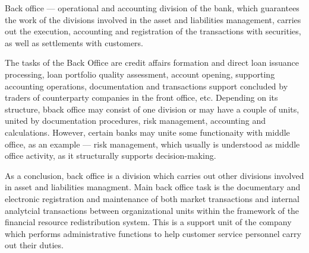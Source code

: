 Back office — operational and accounting division of the bank, which guarantees the work of the divisions involved in the  asset and liabilities management, carries out the execution, accounting and registration of the transactions with securities, as well as settlements with customers. 

The tasks of the Back Office are credit affairs formation and direct loan issuance processing, loan portfolio quality assessment, account opening, supporting accounting operations, documentation and transactions support concluded by traders of counterparty companies in the front office, etc. 
Depending on its structure, bback office may consist of one division or may have a couple of units, united by documentation procedures, risk management, accounting and calculations. However, certain banks may unite some functionaity with middle office, as an example — risk management, which usually is understood as middle office activity, as it structurally supports decision-making.

As a conclusion, back office is a division which carries out other divisions involved in asset and liabilities managment. 
Main back office task is the documentary and electronic registration and maintenance of both market transactions and internal analytcial transactions between organizational units within the framework of the financial resource redistribution system. This is a support unit of the company which performs administrative functions to help customer service personnel carry out their duties.
